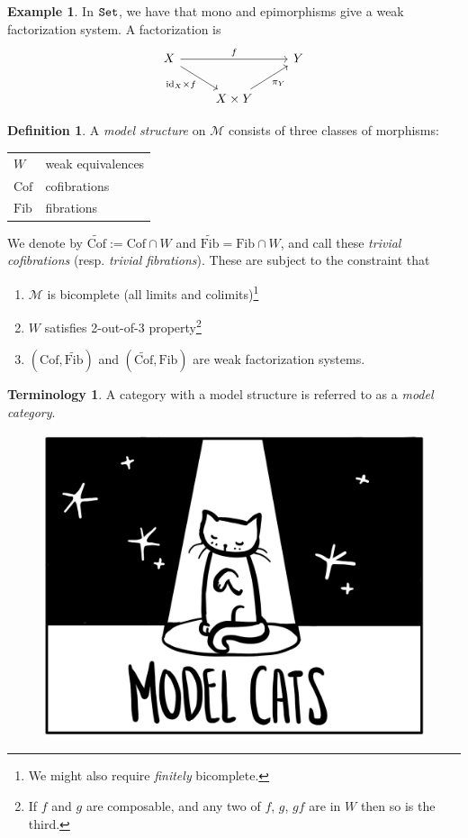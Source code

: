 \documentclass[12pt]{amsart}
\let\til\widetilde
\theoremstyle{definition}
\newtheorem{definition}[theorem]{Definition}
\newtheorem{example}[theorem]{Example}
\newtheorem{terminology}[theorem]{Terminology}
\providecommand{\Cof}{\text{Cof}}
\providecommand{\Fib}{\text{Fib}}
\begin{document}
\begin{example} In $\texttt{Set}$, we have that mono and epimorphisms give a weak factorization system. A factorization is
\[ \begin{tikzcd}
    X\ar[rr,"f" above]\ar[dr,"\id_X \times f" below left] &  & Y\\
     & X \times Y\ar[ur,"\pi_Y" below right] & 
\end{tikzcd} \]
\end{example}

\begin{definition} A \textit{model structure} on $\mathcal{M}$ consists of three classes of morphisms:
\begin{center}
    \begin{tabular}{l | l}
    $W$ & weak equivalences \\
    $\Cof$ & cofibrations \\
    $\Fib$ & fibrations
    \end{tabular}
\end{center}
We denote by $\widetilde{\Cof}:= \Cof \cap W$ and $\widetilde{\Fib} = \Fib \cap W$, and call these \textit{trivial cofibrations} (resp. \textit{trivial fibrations}). These are subject to the constraint that
\begin{enumerate}
    \item $\mathcal{M}$ is bicomplete (all limits and colimits)\footnote{We might also require \textit{finitely} bicomplete.}
    \item $W$ satisfies 2-out-of-3 property\footnote{If $f$ and $g$ are composable, and any two of $f$, $g$, $gf$ are in $W$ then so is the third.}
    \item $\left( \Cof, \til{\Fib} \right)$ and $\left( \widetilde{\Cof}, \Fib \right)$ are weak factorization systems.
\end{enumerate}
\end{definition}

\begin{terminology} A category with a model structure is referred to as a \textit{model category}.
\end{terminology}

\begin{figure}[h]
  \includegraphics[width=0.5\linewidth]{pics/model-cats.jpg}
  \centering

\end{figure}
\end{document}
